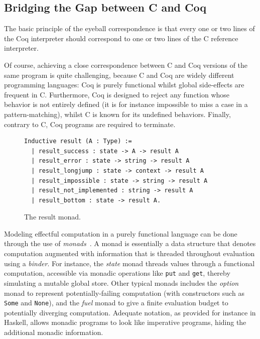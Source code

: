 \documentclass[
    sigplan,
    10pt,
    review, %
    natbib=false %
 ]{acmart}
\newcommand\newtext[1]{{\color{blue} #1}}
\begin{document}
\subsection{Bridging the Gap between C and Coq}
\label{sec:monad}

The basic principle of the eyeball correspondence is that every one or two lines of the Coq interpreter should correspond to one or two lines of the C reference interpreter.

Of course, achieving a close correspondence between C and Coq versions of the same program is quite challenging, because C and Coq are widely different programming languages:
Coq is purely functional
whilst global side-effects are frequent in C.
Furthermore, Coq is designed to reject any function
whose behavior is not entirely defined
(it is for instance impossible to miss a case in a pattern-matching),
whilst C is known for its undefined behaviors.
Finally, contrary to C, Coq programs are required to terminate.

\begin{figure}[t]
\begin{verbatim}
Inductive result (A : Type) :=
  | result_success : state -> A -> result A
  | result_error : state -> string -> result A
  | result_longjump : state -> context -> result A
  | result_impossible : state -> string -> result A
  | result_not_implemented : string -> result A
  | result_bottom : state -> result A.
\end{verbatim}
\vspace{-1em}
\caption{The result monad.}
\label{fig:result}
\end{figure}

\newtext{
Modeling effectful computation in a purely functional language can be done through the use of {\em monads}~\parencite{wadler:mscs1992}. A monad is essentially a data structure that denotes computation augmented with information that is threaded throughout evaluation using a {\em binder}. For instance, the {\em state} monad threads values through a functional computation, accessible via monadic operations like \texttt{put} and \texttt{get}, thereby simulating a mutable global store. Other typical monads includes the {\em option} monad to represent potentially-failing computation (with constructors such as \texttt{Some} and \texttt{None}), and the {\em fuel} monad to give a finite evaluation budget to potentially diverging computation. Adequate notation, as provided for instance in Haskell, allows monadic programs to look like imperative programs, hiding the additional monadic information.
}
\end{document}
